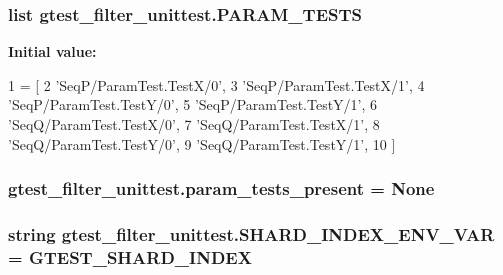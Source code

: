 \subsubsection[{P\+A\+R\+A\+M\+\_\+\+T\+E\+S\+T\+S}]{\setlength{\rightskip}{0pt plus 5cm}list gtest\+\_\+filter\+\_\+unittest.\+P\+A\+R\+A\+M\+\_\+\+T\+E\+S\+T\+S}\label{namespacegtest__filter__unittest_a4c414863f1e2e9ac993ce4afda33f6b9}
{\bfseries Initial value\+:}
\begin{DoxyCode}
1 = [
2     \textcolor{stringliteral}{'SeqP/ParamTest.TestX/0'},
3     \textcolor{stringliteral}{'SeqP/ParamTest.TestX/1'},
4     \textcolor{stringliteral}{'SeqP/ParamTest.TestY/0'},
5     \textcolor{stringliteral}{'SeqP/ParamTest.TestY/1'},
6     \textcolor{stringliteral}{'SeqQ/ParamTest.TestX/0'},
7     \textcolor{stringliteral}{'SeqQ/ParamTest.TestX/1'},
8     \textcolor{stringliteral}{'SeqQ/ParamTest.TestY/0'},
9     \textcolor{stringliteral}{'SeqQ/ParamTest.TestY/1'},
10     ]
\end{DoxyCode}
\hypertarget{namespacegtest__filter__unittest_aab31f58fd88fa64c14e6ab5dc5fb8da3}{}
\subsubsection[{param\+\_\+tests\+\_\+present}]{\setlength{\rightskip}{0pt plus 5cm}gtest\+\_\+filter\+\_\+unittest.\+param\+\_\+tests\+\_\+present = None}\label{namespacegtest__filter__unittest_aab31f58fd88fa64c14e6ab5dc5fb8da3}
\hypertarget{namespacegtest__filter__unittest_a082d5120f29f56d497db94401d773ca7}{}
\subsubsection[{S\+H\+A\+R\+D\+\_\+\+I\+N\+D\+E\+X\+\_\+\+E\+N\+V\+\_\+\+V\+A\+R}]{\setlength{\rightskip}{0pt plus 5cm}string gtest\+\_\+filter\+\_\+unittest.\+S\+H\+A\+R\+D\+\_\+\+I\+N\+D\+E\+X\+\_\+\+E\+N\+V\+\_\+\+V\+A\+R = \textquotesingle{}G\+T\+E\+S\+T\+\_\+\+S\+H\+A\+R\+D\+\_\+\+I\+N\+D\+E\+X\textquotesingle{}}\label{namespacegtest__filter__unittest_a082d5120f29f56d497db94401d773ca7}
\hypertarget{namespacegtest__filter__unittest_acc2e06353cabc6015c98bc37413a63ee}{}
